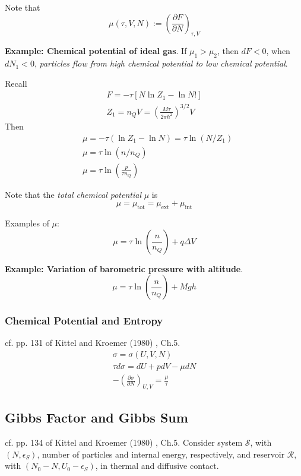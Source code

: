 \documentclass[10pt]{amsart}
\begin{document}
\begin{multicols*}{2}
Note that 
\begin{equation}
  \mu(\tau,V,N) := \left( \frac{ \partial F}{ \partial N} \right)_{\tau,V}
\end{equation}

\textbf{Example: Chemical potential of ideal gas}.  If $\mu_1 > \mu_2$, then $dF <0$, when $dN_1 <0$, \emph{particles flow from high chemical potential to low chemical potential}.  

Recall
\[
\begin{gathered}
  F = -\tau [ N \ln{Z_1} - \ln{N!} ] \\ 
  Z_1 = n_Q V = \left( \frac{M\tau}{2\pi \hbar^2} \right)^{3/2} V
\end{gathered}
\]
Then
\[
\begin{aligned}
  & \mu = -\tau (\ln{Z_1} - \ln{N} ) = \tau \ln{(N/Z_1 ) } \\ 
  & \mu = \tau \ln{ (n/n_Q ) } \\ 
  & \mu = \tau \ln{ \left( \frac{p}{\tau n_Q } \right) }
\end{aligned}
\]

Note that the \emph{total chemical potential} $\mu$ is 
\[
\mu = \mu_{\text{tot}} = \mu_{\text{ext} } + \mu_{\text{int}}
\]

Examples of $\mu$:
\[
\mu = \tau \ln{ \left( \frac{n}{n_Q} \right) } + q\Delta V
\]

\textbf{Example: Variation of barometric pressure with altitude}.  \[
\mu = \tau \ln{ \left( \frac{n}{n_Q} \right) } + Mgh
\]

\subsubsection{Chemical Potential and Entropy} cf. pp. 131 of Kittel and Kroemer (1980) \cite{CKittelHKroemer1980}, Ch.5.  
\[
\begin{gathered}
  \sigma = \sigma(U,V,N) \\ 
  \tau d\sigma = dU + pdV - \mu dN \\
  - \left( \frac{ \partial \sigma }{ \partial N} \right)_{U,V} = \frac{\mu}{\tau}
\end{gathered}
\]

\subsection{Gibbs Factor and Gibbs Sum} cf. pp. 134 of Kittel and Kroemer (1980) \cite{CKittelHKroemer1980}, Ch.5.  
Consider system $\mathcal{S}$, with $(N,\epsilon_S)$, number of particles and internal energy, respectively, and reservoir $\mathcal{R}$, with $(N_0-N,U_0-\epsilon_S)$, in thermal and diffusive contact.  


\end{multicols*}
\end{document}
